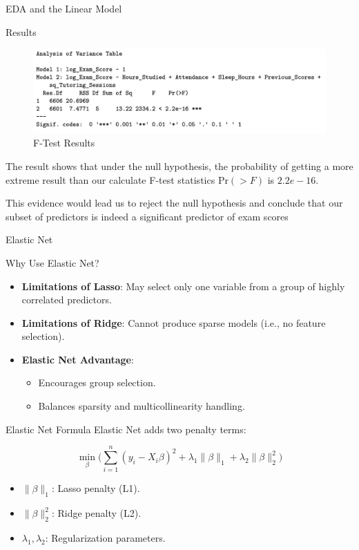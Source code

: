 \documentclass[
  ignorenonframetext,
]{beamer}
\providecommand{\tightlist}{%
  \setlength{\itemsep}{0pt}\setlength{\parskip}{0pt}}\usepackage{longtable,booktabs,array}
\begin{document}
\begin{frame}[fragile]{EDA and the Linear Model}
\begin{block}{Results}
\begin{figure}[H]
{\centering \includegraphics{anova-results.png}

}

\caption{F-Test Results}

\end{figure}%

The result shows that under the null hypothesis, the probability of
getting a more extreme result than our calculate F-test statistics
\(\text{Pr}(>F)\) is \(2.2e− 16\).

This evidence would lead us to reject the null hypothesis and conclude
that our subset of predictors is indeed a significant predictor of exam
scores
\end{block}
\end{frame}

\begin{frame}{Elastic Net}
\label{elastic-net}
\end{frame}

\begin{frame}{Why Use Elastic Net?}
\label{why-use-elastic-net}
\begin{itemize}
\tightlist
\item
  \textbf{Limitations of Lasso}: May select only one variable from a
  group of highly correlated predictors.
\item
  \textbf{Limitations of Ridge}: Cannot produce sparse models (i.e., no
  feature selection).
\item
  \textbf{Elastic Net Advantage}:

  \begin{itemize}
  \tightlist
  \item
    Encourages group selection.
  \item
    Balances sparsity and multicollinearity handling.
  \end{itemize}
\end{itemize}
\end{frame}

\begin{frame}{Elastic Net Formula}
\label{elastic-net-formula}
Elastic Net adds two penalty terms:

\[ \min_{\beta} \Bigg( \sum_{i=1}^n (y_i - X_i \beta)^2 + \lambda_1 \|\beta\|_1 + \lambda_2 \|\beta\|_2^2 \Bigg) \]

\begin{itemize}
\tightlist
\item
  \(\|\beta\|_1\): Lasso penalty (L1).
\item
  \(\|\beta\|_2^2\): Ridge penalty (L2).
\item
  \(\lambda_1, \lambda_2\): Regularization parameters.
\end{itemize}
\end{frame}
\end{document}

